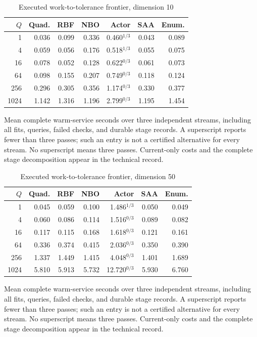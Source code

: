 \begin{table}[htbp]
\centering\small
\caption{Executed work-to-tolerance frontier, dimension 10}\label{tab:r19frontier10}
\begin{tabular}{rrrrrrr}
\toprule
$Q$ & Quad. & RBF & NBO & Actor & SAA & Enum.\\
\midrule
1 & 0.036 & 0.099 & 0.336 & 0.460$^{1/3}$ & 0.043 & 0.089\\
4 & 0.059 & 0.056 & 0.176 & 0.518$^{1/3}$ & 0.055 & 0.075\\
16 & 0.078 & 0.052 & 0.128 & 0.622$^{0/3}$ & 0.061 & 0.073\\
64 & 0.098 & 0.155 & 0.207 & 0.749$^{0/3}$ & 0.118 & 0.124\\
256 & 0.296 & 0.305 & 0.356 & 1.174$^{0/3}$ & 0.330 & 0.377\\
1024 & 1.142 & 1.316 & 1.196 & 2.799$^{0/3}$ & 1.195 & 1.454\\
\bottomrule
\end{tabular}
\par\smallskip\begin{minipage}{.96\textwidth}\footnotesize Mean complete warm-service seconds over three independent streams, including all fits, queries, failed checks, and durable stage records. A superscript reports fewer than three passes; such an entry is not a certified alternative for every stream. No superscript means three passes. Current-only costs and the complete stage decomposition appear in the technical record.\end{minipage}
\end{table}
\begin{table}[htbp]
\centering\small
\caption{Executed work-to-tolerance frontier, dimension 50}\label{tab:r19frontier50}
\begin{tabular}{rrrrrrr}
\toprule
$Q$ & Quad. & RBF & NBO & Actor & SAA & Enum.\\
\midrule
1 & 0.045 & 0.059 & 0.100 & 1.486$^{1/3}$ & 0.050 & 0.049\\
4 & 0.060 & 0.086 & 0.114 & 1.516$^{0/3}$ & 0.089 & 0.082\\
16 & 0.117 & 0.115 & 0.168 & 1.618$^{0/3}$ & 0.121 & 0.161\\
64 & 0.336 & 0.374 & 0.415 & 2.036$^{0/3}$ & 0.350 & 0.390\\
256 & 1.337 & 1.449 & 1.415 & 4.048$^{0/3}$ & 1.401 & 1.689\\
1024 & 5.810 & 5.913 & 5.732 & 12.720$^{0/3}$ & 5.930 & 6.760\\
\bottomrule
\end{tabular}
\par\smallskip\begin{minipage}{.96\textwidth}\footnotesize Mean complete warm-service seconds over three independent streams, including all fits, queries, failed checks, and durable stage records. A superscript reports fewer than three passes; such an entry is not a certified alternative for every stream. No superscript means three passes. Current-only costs and the complete stage decomposition appear in the technical record.\end{minipage}
\end{table}
